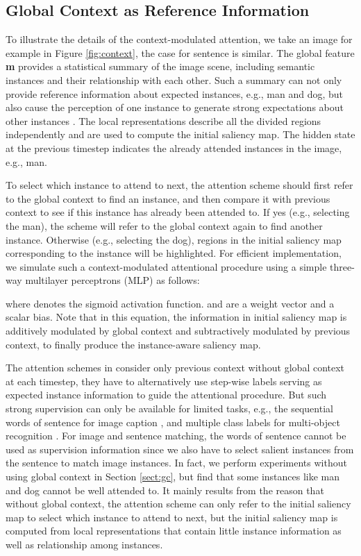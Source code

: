 \documentclass[10pt,twocolumn,letterpaper]{article}
\begin{document}
\subsection{Global Context as Reference Information}




To illustrate the details of the context-modulated attention,
we take an image for example in Figure \ref{fig:context},
the case for sentence is similar.
The global feature \textbf{m} provides a statistical summary of the image scene,
including semantic instances and their relationship with each other.
Such a summary can not only provide reference information about
expected instances, e.g., man and dog,
but also cause the perception of one instance to generate
strong expectations about other instances \cite{chun1999top}.
The local representations 
describe all the divided regions independently
and are used to compute the initial saliency map.
The hidden state at the previous timestep 
indicates the already attended instances in the image, e.g., man.

To select which instance to attend to next,
the attention scheme should first refer to the global context to find an instance,
and then compare it with previous context to see if this instance has already been attended to.
If yes (e.g., selecting the man), the scheme will refer to the global context again to find another instance.
Otherwise (e.g., selecting the dog), regions in the initial saliency map corresponding to the instance will be highlighted.
For efficient implementation, we simulate such a context-modulated attentional procedure using
a simple three-way multilayer perceptrons (MLP)
as follows:

where  denotes the sigmoid activation function.  and  are a weight vector and a scalar bias.
Note that in this equation,
the information in initial saliency map is additively modulated by
global context and subtractively modulated by previous context,
to finally produce the instance-aware saliency map.


The attention schemes in \cite{xu2015show,bahdanau2014neural,ba2014multiple}
consider only previous context without global context at each timestep,
they have to alternatively use step-wise labels serving as expected instance
information to guide the attentional procedure.
But such strong supervision can only be available for
limited tasks, e.g., the sequential words of sentence for image caption \cite{xu2015show},
and multiple class labels for multi-object recognition \cite{ba2014multiple}.
For image and sentence matching, the words of sentence cannot be used as
supervision information since we also have to select salient instances from
the sentence to match image instances.
In fact, we perform experiments without using global context in Section \ref{sect:gc},
but find that some instances like man and dog cannot be well attended to.
It mainly results from the reason that without global context, the attention scheme
can only refer to the initial saliency map to select which instance to attend to next,
but the initial saliency map is computed from local representations
that contain little instance information as well as relationship among instances.
\end{document}

